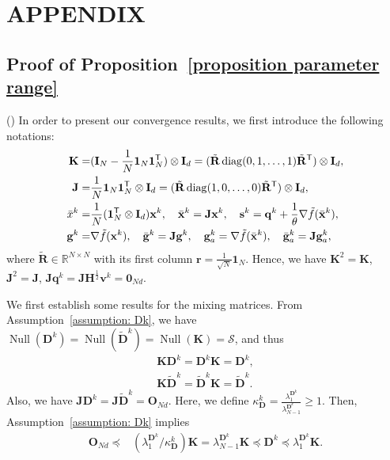 \documentclass[12pt,draftcls,onecolumn]{IEEEtran}
\renewcommand{\Re}{{\mathbb{R}}}
\newcommand{\bH}{{\mathbf{H}}}
\begin{document}
\section{APPENDIX} \label{appendix}
\subsection{Proof of Proposition~\ref{proposition parameter range}}\label{proof proposition}
() In order to present our convergence results, we first introduce the following notations:
\begin{align}
	\mathbf{K} =& (\mathbf{I}_N - \frac{1}{N} \mathbf{1}_N \mathbf{1}_N ^{\mathsf{T}}) \otimes \mathbf{I}_d = (\tilde{\mathbf{R}}\operatorname{diag}(0,1,\dots,1) \tilde{\mathbf{R}}^\mathsf{T}) \otimes \mathbf{I}_d, \notag\\
	\mathbf{J} =& \frac{1}{N}\mathbf{1}_N \mathbf{1}_N ^{\mathsf{T}} \otimes \mathbf{I}_d = (\tilde{\mathbf{R}}\operatorname{diag}(1,0,\dots,0) \tilde{\mathbf{R}}^\mathsf{T}) \otimes \mathbf{I}_d, \notag\\
	\bar{x}^k =& \frac{1}{N}(\mathbf{1}_N^{\mathsf{T}} \otimes \mathbf{I}_d) \mathbf{x}^k, \quad \bar{\mathbf{x}}^k = \mathbf{J} \mathbf{x}^k,\quad \mathbf{s}^k=\mathbf{q}^k+\frac{1}{\theta}\nabla \tilde{f}(\bar{\mathbf{x}}^k), \notag\\
	\mathbf{g}^k =& \nabla \tilde{f}(\mathbf{x}^k), \quad \bar{\mathbf{g}}^k = \mathbf{J} \mathbf{g}^k, \quad \mathbf{g}_a^k = \nabla \tilde{f}(\bar{\mathbf{x}}^k), \quad \bar{\mathbf{g}}_a^k = \mathbf{J} \mathbf{g}_a^k, \notag
\end{align}
where $\tilde{\mathbf{R}}\in \Re ^{N \times N}$ with its first column $\mathbf{r} = \frac{1}{\sqrt{N}} \mathbf{1}_N$. Hence, we have $\mathbf{K}^2=\mathbf{K}$, $\mathbf{J}^2=\mathbf{J}$, $\mathbf{J}\mathbf{q}^k = \mathbf{J}\bH^{\frac{1}{2}}\mathbf{v}^k= \mathbf{0}_{Nd}$.

We first establish some results for the mixing matrices. From Assumption~\ref{assumption: Dk}, we have $ \operatorname{Null} (\mathbf{D}^k) = \operatorname{Null} (\tilde{\mathbf{D}}^k) =\operatorname{Null} (\mathbf{K}) = \mathcal{S}$, and thus 
\begin{align}
	\label{KDk=DkK}\mathbf{K}\mathbf{D}^k = \mathbf{D}^k\mathbf{K} = \mathbf{D}^k, \\
	\label{KtildeDk=tildeDkK}\mathbf{K}\mathbf{\tilde{D}}^k = \mathbf{\tilde{D}}^k\mathbf{K} = \mathbf{\tilde{D}}^k.
\end{align}
Also, we have $\mathbf{J}\mathbf{D}^k = \mathbf{J}\tilde{\mathbf{D}}^k=\mathbf{O}_{Nd}$. Here, we define ${\kappa_{\mathbf{D}}^k} = \frac{\lambda_{1}^{\mathbf{D}^k}}{\lambda_{N-1}^{\mathbf{D}^k}}\geq 1$. Then, Assumption~\ref{assumption: Dk} implies
	\begin{align}
		\mathbf{O}_{Nd} \preceq&(\lambda_{1}^{\mathbf{D}^k}/\kappa_{\mathbf{D}}^k)\mathbf{K} = \lambda_{N-1}^{\mathbf{D}^k}\mathbf{K} \preceq \mathbf{D}^k \preceq \lambda_{1}^{\mathbf{D}^k}\mathbf{K}. \label{Dk range}
	\end{align}
\end{document}
